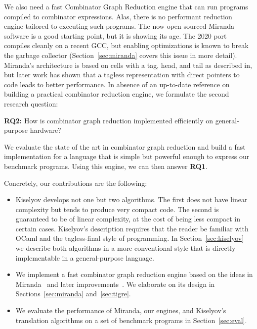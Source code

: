 \documentclass[conference]{IEEEtran}
\begin{document}
We also need a fast Combinator Graph Reduction engine that can run programs compiled to combinator expressions.
Alas, there is no performant reduction engine tailored to executing such programs.
The now open-sourced Miranda software is a good starting point, but it is showing its age.
The 2020 port compiles cleanly on a recent GCC, but enabling optimizations is known to break the garbage collector (Section~\ref{sec:miranda} covers this issue in more detail).
Miranda's architecture is based on cells with a tag, head, and tail as described in\cite{turner_new_1979}, but later work has shown that a tagless representation with direct pointers to code leads to better performance\cite{koopman_fresh_1989}.
In absence of an up-to-date reference on building a practical combinator reduction engine, we formulate the second research question:

\textbf{RQ2:} How is combinator graph reduction implemented efficiently on general-purpose hardware?

We evaluate the state of the art in combinator graph reduction and build a fast implementation for a language that is simple but powerful enough to express our benchmark programs.
Using this engine, we can then answer \textbf{RQ1}.

Concretely, our contributions are the following:
\begin{itemize}
    \item Kiselyov develops not one but two algorithms. The first does not have linear complexity but tends to produce very compact code.
          The second is guaranteed to be of linear complexity, at the cost of being less compact in certain cases.
          Kiselyov's description requires that the reader be familiar with OCaml and the tagless-final style of programming.
          In Section~\ref{sec:kiselyov} we describe both algorithms in a more conventional style that is directly implementable in a general-purpose language.
    \item We implement a fast combinator graph reduction engine based on the ideas in Miranda~\cite{turner_miranda_1985} and later improvements~\cite{koopman_architecture_1992}.
          We elaborate on its design in Sections~\ref{sec:miranda} and~\ref{sec:tigre}.
    \item We evaluate the performance of Miranda, our engines, and Kiselyov's translation algorithms on a set of benchmark programs in Section~\ref{sec:eval}.
\end{itemize}
\end{document}
